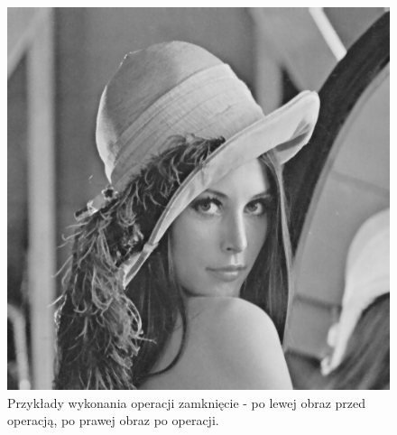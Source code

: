 \documentclass{article}
\begin{document}
\begin{figure}[!htb]
\includegraphics[scale=0.2]{img/Zamkniecie_Obrazu_lena_8bit.png} 
\caption{Przykłady wykonania operacji zamknięcie - po lewej obraz przed operacją, po prawej obraz po operacji. }
\end{figure}

\FloatBarrier
\end{document}
